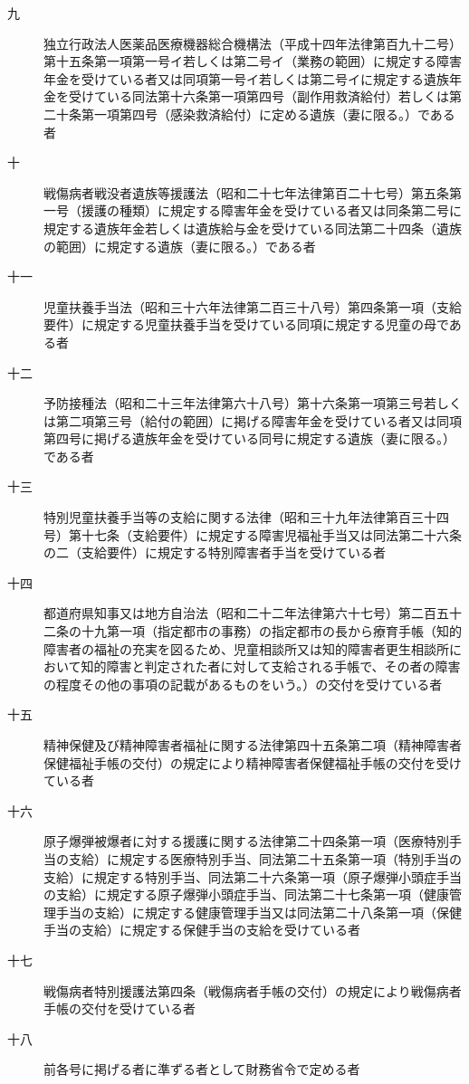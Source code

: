 \documentclass[twocolumn,a4j,10pt]{ltjtarticle}
\begin{document}
\begin{description}
\begin{description}
\item[九]独立行政法人医薬品医療機器総合機構法（平成十四年法律第百九十二号）第十五条第一項第一号イ若しくは第二号イ（業務の範囲）に規定する障害年金を受けている者又は同項第一号イ若しくは第二号イに規定する遺族年金を受けている同法第十六条第一項第四号（副作用救済給付）若しくは第二十条第一項第四号（感染救済給付）に定める遺族（妻に限る。）である者
\item[十]戦傷病者戦没者遺族等援護法（昭和二十七年法律第百二十七号）第五条第一号（援護の種類）に規定する障害年金を受けている者又は同条第二号に規定する遺族年金若しくは遺族給与金を受けている同法第二十四条（遺族の範囲）に規定する遺族（妻に限る。）である者
\item[十一]児童扶養手当法（昭和三十六年法律第二百三十八号）第四条第一項（支給要件）に規定する児童扶養手当を受けている同項に規定する児童の母である者
\item[十二]予防接種法（昭和二十三年法律第六十八号）第十六条第一項第三号若しくは第二項第三号（給付の範囲）に掲げる障害年金を受けている者又は同項第四号に掲げる遺族年金を受けている同号に規定する遺族（妻に限る。）である者
\item[十三]特別児童扶養手当等の支給に関する法律（昭和三十九年法律第百三十四号）第十七条（支給要件）に規定する障害児福祉手当又は同法第二十六条の二（支給要件）に規定する特別障害者手当を受けている者
\item[十四]都道府県知事又は地方自治法（昭和二十二年法律第六十七号）第二百五十二条の十九第一項（指定都市の事務）の指定都市の長から療育手帳（知的障害者の福祉の充実を図るため、児童相談所又は知的障害者更生相談所において知的障害と判定された者に対して支給される手帳で、その者の障害の程度その他の事項の記載があるものをいう。）の交付を受けている者
\item[十五]精神保健及び精神障害者福祉に関する法律第四十五条第二項（精神障害者保健福祉手帳の交付）の規定により精神障害者保健福祉手帳の交付を受けている者
\item[十六]原子爆弾被爆者に対する援護に関する法律第二十四条第一項（医療特別手当の支給）に規定する医療特別手当、同法第二十五条第一項（特別手当の支給）に規定する特別手当、同法第二十六条第一項（原子爆弾小頭症手当の支給）に規定する原子爆弾小頭症手当、同法第二十七条第一項（健康管理手当の支給）に規定する健康管理手当又は同法第二十八条第一項（保健手当の支給）に規定する保健手当の支給を受けている者
\item[十七]戦傷病者特別援護法第四条（戦傷病者手帳の交付）の規定により戦傷病者手帳の交付を受けている者
\item[十八]前各号に掲げる者に準ずる者として財務省令で定める者
\end{description}
\end{description}
\end{document}
